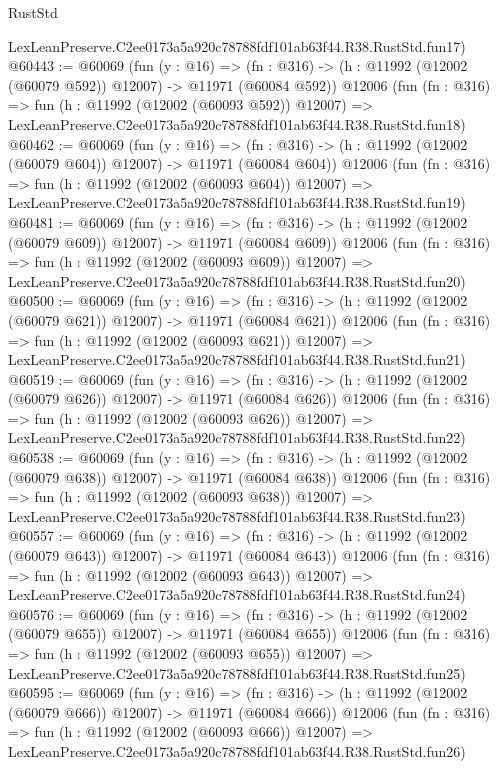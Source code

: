 \begin{lexlean}{RustStd}
\begin{coremodule}
    LexLeanPreserve.C2ee0173a5a920c78788fdf101ab63f44.R38.RustStd.fun17)
@60443 := @60069
    (fun (y : @16) =>
    (fn : @316) -> (h : @11992 (@12002 (@60079 @592)) @12007) -> @11971 (@60084 @592))
    @12006
    (fun (fn : @316) =>
    fun (h : @11992 (@12002 (@60093 @592)) @12007) =>
    LexLeanPreserve.C2ee0173a5a920c78788fdf101ab63f44.R38.RustStd.fun18)
@60462 := @60069
    (fun (y : @16) =>
    (fn : @316) -> (h : @11992 (@12002 (@60079 @604)) @12007) -> @11971 (@60084 @604))
    @12006
    (fun (fn : @316) =>
    fun (h : @11992 (@12002 (@60093 @604)) @12007) =>
    LexLeanPreserve.C2ee0173a5a920c78788fdf101ab63f44.R38.RustStd.fun19)
@60481 := @60069
    (fun (y : @16) =>
    (fn : @316) -> (h : @11992 (@12002 (@60079 @609)) @12007) -> @11971 (@60084 @609))
    @12006
    (fun (fn : @316) =>
    fun (h : @11992 (@12002 (@60093 @609)) @12007) =>
    LexLeanPreserve.C2ee0173a5a920c78788fdf101ab63f44.R38.RustStd.fun20)
@60500 := @60069
    (fun (y : @16) =>
    (fn : @316) -> (h : @11992 (@12002 (@60079 @621)) @12007) -> @11971 (@60084 @621))
    @12006
    (fun (fn : @316) =>
    fun (h : @11992 (@12002 (@60093 @621)) @12007) =>
    LexLeanPreserve.C2ee0173a5a920c78788fdf101ab63f44.R38.RustStd.fun21)
@60519 := @60069
    (fun (y : @16) =>
    (fn : @316) -> (h : @11992 (@12002 (@60079 @626)) @12007) -> @11971 (@60084 @626))
    @12006
    (fun (fn : @316) =>
    fun (h : @11992 (@12002 (@60093 @626)) @12007) =>
    LexLeanPreserve.C2ee0173a5a920c78788fdf101ab63f44.R38.RustStd.fun22)
@60538 := @60069
    (fun (y : @16) =>
    (fn : @316) -> (h : @11992 (@12002 (@60079 @638)) @12007) -> @11971 (@60084 @638))
    @12006
    (fun (fn : @316) =>
    fun (h : @11992 (@12002 (@60093 @638)) @12007) =>
    LexLeanPreserve.C2ee0173a5a920c78788fdf101ab63f44.R38.RustStd.fun23)
@60557 := @60069
    (fun (y : @16) =>
    (fn : @316) -> (h : @11992 (@12002 (@60079 @643)) @12007) -> @11971 (@60084 @643))
    @12006
    (fun (fn : @316) =>
    fun (h : @11992 (@12002 (@60093 @643)) @12007) =>
    LexLeanPreserve.C2ee0173a5a920c78788fdf101ab63f44.R38.RustStd.fun24)
@60576 := @60069
    (fun (y : @16) =>
    (fn : @316) -> (h : @11992 (@12002 (@60079 @655)) @12007) -> @11971 (@60084 @655))
    @12006
    (fun (fn : @316) =>
    fun (h : @11992 (@12002 (@60093 @655)) @12007) =>
    LexLeanPreserve.C2ee0173a5a920c78788fdf101ab63f44.R38.RustStd.fun25)
@60595 := @60069
    (fun (y : @16) =>
    (fn : @316) -> (h : @11992 (@12002 (@60079 @666)) @12007) -> @11971 (@60084 @666))
    @12006
    (fun (fn : @316) =>
    fun (h : @11992 (@12002 (@60093 @666)) @12007) =>
    LexLeanPreserve.C2ee0173a5a920c78788fdf101ab63f44.R38.RustStd.fun26)

\end{coremodule}
\end{lexlean}
